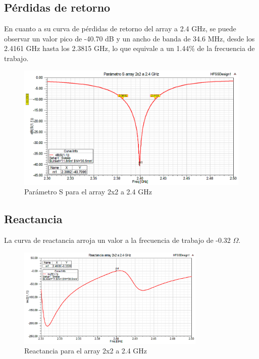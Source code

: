 \subsection{Pérdidas de retorno}
\par En cuanto a su curva de pérdidas de retorno del array a 2.4 GHz, se puede observar un valor pico de -40.70 dB y un ancho de banda de 34.6 MHz, desde los 2.4161 GHz hasta los 2.3815 GHz, lo que equivale a un 1.44\% de la frecuencia de trabajo.
\\
\begin{figure}[H]
    \centering
        \includegraphics[width=\textwidth]{archivos/analisis/2x21/1}
        \caption{Parámetro S para el array 2x2 a 2.4 GHz}
        \label{fig:s2x21}
\end{figure}

\newpage
\subsection{Reactancia}
\par La curva de reactancia arroja un valor a la frecuencia de trabajo de -0.32 $\Omega$. 
\\
\begin{figure}[H]
    \centering
        \includegraphics[width=0.8\textwidth]{archivos/analisis/2x21/2}
        \caption{Reactancia para el array 2x2 a 2.4 GHz}
        \label{fig:react2x21}
\end{figure}

